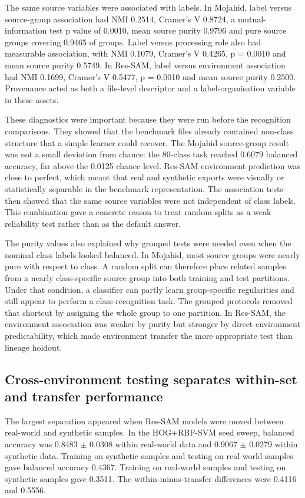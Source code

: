 \documentclass[]{interact}
\begin{document}
The same source variables were associated with labels. In Mojahid, label versus source-group association had NMI 0.2514, Cramer's V 0.8724, a mutual-information test p value of 0.0010, mean source purity 0.9796 and pure source groups covering 0.9465 of groups. Label versus processing role also had measurable association, with NMI 0.1079, Cramer's V 0.4265, p = 0.0010 and mean source purity 0.5749. In Res-SAM, label versus environment association had NMI 0.1699, Cramer's V 0.5477, p = 0.0010 and mean source purity 0.2500. Provenance acted as both a file-level descriptor and a label-organisation variable in these assets.

These diagnostics were important because they were run before the recognition comparisons. They showed that the benchmark files already contained non-class structure that a simple learner could recover. The Mojahid source-group result was not a small deviation from chance: the 80-class task reached 0.6079 balanced accuracy, far above the 0.0125 chance level. Res-SAM environment prediction was close to perfect, which meant that real and synthetic exports were visually or statistically separable in the benchmark representation. The association tests then showed that the same source variables were not independent of class labels. This combination gave a concrete reason to treat random splits as a weak reliability test rather than as the default answer.

The purity values also explained why grouped tests were needed even when the nominal class labels looked balanced. In Mojahid, most source groups were nearly pure with respect to class. A random split can therefore place related samples from a nearly class-specific source group into both training and test partitions. Under that condition, a classifier can partly learn group-specific regularities and still appear to perform a class-recognition task. The grouped protocols removed that shortcut by assigning the whole group to one partition. In Res-SAM, the environment association was weaker by purity but stronger by direct environment predictability, which made environment transfer the more appropriate test than lineage holdout.

\subsection{Cross-environment testing separates within-set and transfer performance}

The largest separation appeared when Res-SAM models were moved between real-world and synthetic samples. In the HOG+RBF-SVM seed sweep, balanced accuracy was 0.8483 \(\pm\) 0.0308 within real-world data and 0.9067 \(\pm\) 0.0279 within synthetic data. Training on synthetic samples and testing on real-world samples gave balanced accuracy 0.4367. Training on real-world samples and testing on synthetic samples gave 0.3511. The within-minus-transfer differences were 0.4116 and 0.5556.
\end{document}
